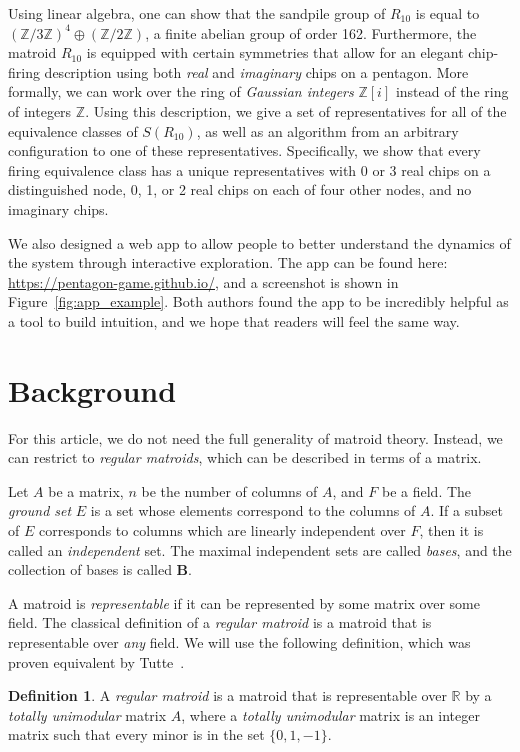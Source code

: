 \documentclass[12p]{amsart}
\numberwithin{equation}{section}
\theoremstyle{plain}
\theoremstyle{definition}
\newtheorem{defn}[thm]{Definition}
\newcommand{\Z}{\mathbb {Z}}
\begin{document}
Using linear algebra, one can show that the sandpile group of $R_{10}$ is equal to $(\Z/3\Z)^4 \oplus (\Z/2\Z)$, a finite abelian group of order 162. Furthermore, the matroid $R_{10}$ is equipped with certain symmetries that allow for an elegant chip-firing description using both \emph{real} and \emph{imaginary} chips on a pentagon. More formally, we can work over the ring of \emph{Gaussian integers} $\Z[i]$ instead of the ring of integers $\Z$. Using this description, we give a set of representatives for all of the equivalence classes of $S(R_{10})$, as well as an algorithm from an arbitrary configuration to one of these representatives. Specifically, we show that every firing equivalence class has a unique representatives with 0 or 3 real chips on a distinguished node, 0, 1, or 2 real chips on each of four other nodes, and no imaginary chips. 

We also designed a web app to allow people to better understand the dynamics of the system through interactive exploration. The app can be found here: \url{https://pentagon-game.github.io/}, and a screenshot is shown in Figure~\ref{fig:app_example}. Both authors found the app to be incredibly helpful as a tool to build intuition, and we hope that readers will feel the same way. 

\section{Background} 

For this article, we do not need the full generality of matroid theory. Instead, we can restrict to \emph{regular matroids}, which can be described in terms of a matrix.

Let $A$ be a matrix, $n$ be the number of columns of $A$, and $F$ be a field. The \emph{ground set} $E$ is a set whose elements correspond to the columns of $A$. If a subset of $E$ corresponds to columns which are linearly independent over $F$, then it is called an \emph{independent} set. The maximal independent sets are called \emph{bases}, and the collection of bases is called $\mathbf B$.

A matroid is \emph{representable} if it can be represented by some matrix over some field. The classical definition of a \emph{regular matroid} is a matroid that is representable over \emph{any} field. We will use the following definition, which was proven equivalent by Tutte~\cite{Tutte}. 
\begin{defn}
    A \emph{regular matroid} is a matroid that is representable over $\mathbb R$ by a \emph{totally unimodular} matrix $A$, where a \emph{totally unimodular} matrix is an integer matrix such that every minor is in the set $\{0, 1,-1\}$. 
\end{defn}
\end{document}
